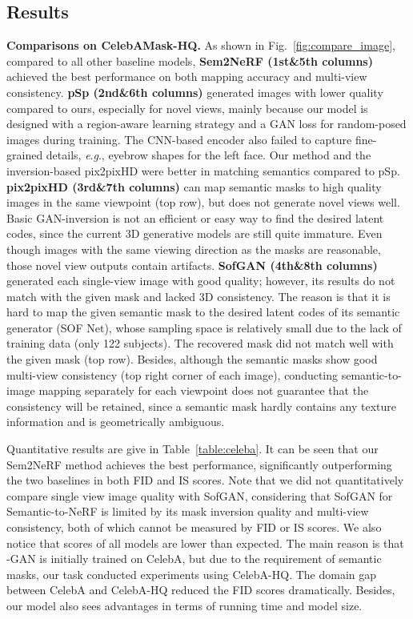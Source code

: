 \documentclass[runningheads]{llncs}
\newcommand{\eg}{\textit{e}.\textit{g}.}
\begin{document}
\subsection{Results}
\noindent\textbf{Comparisons on CelebAMask-HQ.} 
As shown in Fig.~\ref{fig:compare_image}, compared to all other baseline models,  \textbf{Sem2NeRF (1st\&5th columns)} achieved the best performance on both mapping accuracy and multi-view consistency. 
\textbf{pSp (2nd\&6th columns)} generated images with lower quality compared to ours, especially for novel views, mainly because our model is designed with a region-aware learning strategy and a GAN loss for random-posed images during training. The CNN-based encoder also failed to capture fine-grained details, \eg, eyebrow shapes for the left face. Our method and the inversion-based pix2pixHD were better in matching semantics compared to pSp.
\textbf{pix2pixHD (3rd\&7th columns)} can map semantic masks to high quality images in the same viewpoint (top row), but does not generate novel views well.
Basic GAN-inversion is not an efficient or easy way to find the desired latent codes, since the current 3D generative models are still quite immature. Even though images with the same viewing direction as the masks are reasonable, those novel view outputs contain artifacts.
\textbf{SofGAN (4th\&8th columns)} generated each single-view image with good quality; however, its results do not match with the given mask and lacked 3D consistency. The reason is that it is hard to map the given semantic mask to the desired latent codes of its semantic generator (SOF Net), whose sampling space is relatively small due to the lack of training data (only 122 subjects). The recovered mask did not match well with the given mask (top row). Besides, although the semantic masks show good multi-view consistency (top right corner of each image), conducting semantic-to-image mapping separately for each viewpoint does not guarantee that the consistency will be retained, since a semantic mask hardly contains any texture information and is geometrically ambiguous.



Quantitative results are give in Table~\ref{table:celeba}. 
It can be seen that our Sem2NeRF method achieves the best performance,  significantly outperforming the two baselines in both FID and IS scores. Note that we did not quantitatively compare single view image quality with SofGAN, considering that SofGAN for Semantic-to-NeRF is limited by its mask inversion quality and multi-view consistency, both of which cannot be measured by FID or IS scores.  We also notice that scores of all models are lower than expected. The main reason is that -GAN is initially trained on CelebA, but due to the requirement of semantic masks, our task conducted experiments using CelebA-HQ. The domain gap between CelebA and CelebA-HQ reduced the FID scores dramatically. Besides, our model also sees advantages in terms of running time and model size. 
\end{document}
